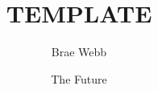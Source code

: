 \documentclass{csse4400}
\title{TEMPLATE}
\author{Brae Webb}
\date{{\color{red} The Future}}
\begin{document}
\makecover





\end{document}
